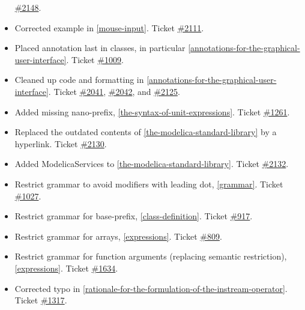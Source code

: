\begin{itemize}
  \href{https://github.com/modelica/ModelicaSpecification/issues/2148}{\#2148}.
\item
  Corrected example in \cref{mouse-input}. Ticket
  \href{https://github.com/modelica/ModelicaSpecification/issues/2111}{\#2111}.
\item
  Placed annotation last in classes, in particular \cref{annotations-for-the-graphical-user-interface}. Ticket
  \href{https://github.com/modelica/ModelicaSpecification/issues/1009}{\#1009}.
\item
  Cleaned up code and formatting in \cref{annotations-for-the-graphical-user-interface}. Ticket
  \href{https://github.com/modelica/ModelicaSpecification/issues/2041}{\#2041},
  \href{https://github.com/modelica/ModelicaSpecification/issues/2042}{\#2042}, and
  \href{https://github.com/modelica/ModelicaSpecification/issues/2125}{\#2125}.
\item
  Added missing nano-prefix, \cref{the-syntax-of-unit-expressions}. Ticket
  \href{https://github.com/modelica/ModelicaSpecification/issues/1261}{\#1261}.
\item
  Replaced the outdated contents of \cref{the-modelica-standard-library} by a hyperlink. Ticket
  \href{https://github.com/modelica/ModelicaSpecification/issues/2130}{\#2130}.
\item
  Added ModelicaServices to \cref{the-modelica-standard-library}. Ticket
  \href{https://github.com/modelica/ModelicaSpecification/issues/2132}{\#2132}.
\item
  Restrict grammar to avoid modifiers with leading dot, \cref{grammar}.
  Ticket \href{https://github.com/modelica/ModelicaSpecification/issues/1027}{\#1027}.
\item
  Restrict grammar for base-prefix, \cref{class-definition}. Ticket
  \href{https://github.com/modelica/ModelicaSpecification/issues/917}{\#917}.
\item
  Restrict grammar for arrays, \cref{expressions}. Ticket
  \href{https://github.com/modelica/ModelicaSpecification/issues/809}{\#809}.
\item
  Restrict grammar for function arguments (replacing semantic
  restriction), \cref{expressions}. Ticket
  \href{https://github.com/modelica/ModelicaSpecification/issues/1634}{\#1634}.
\item
  Corrected typo in \cref{rationale-for-the-formulation-of-the-instream-operator}. Ticket
  \href{https://github.com/modelica/ModelicaSpecification/issues/1317}{\#1317}.
\end{itemize}

